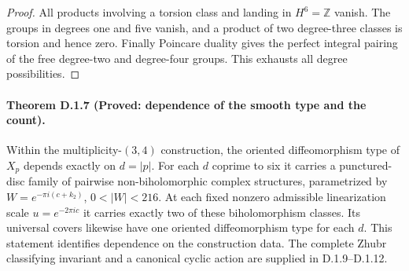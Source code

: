 \begin{proof}
All products involving a torsion class and landing in $H^6=\mathbb Z$
vanish. The groups in degrees one and five vanish, and a product of
two degree-three classes is torsion and hence zero. Finally Poincare
duality gives the perfect integral pairing of the free degree-two
and degree-four groups. This exhausts all degree possibilities.
\end{proof}

\paragraph{Theorem D.1.7 (Proved: dependence of the smooth type and the count).}
Within the multiplicity-$(3,4)$ construction, the oriented
diffeomorphism type of $X_p$ depends exactly on $d=|p|$.
For each $d$ coprime to six it carries a punctured-disc family of
pairwise non-biholomorphic complex structures, parametrized by
$W=e^{-\pi i(c+k_2)}$, $0<|W|<216$. At each fixed nonzero admissible
linearization scale $u=e^{-2\pi ic}$ it carries exactly two of these
biholomorphism classes. Its universal covers likewise have one
oriented diffeomorphism type for each $d$. This statement identifies
dependence on the construction data. The complete Zhubr classifying
invariant and a canonical cyclic action are supplied in D.1.9--D.1.12.
